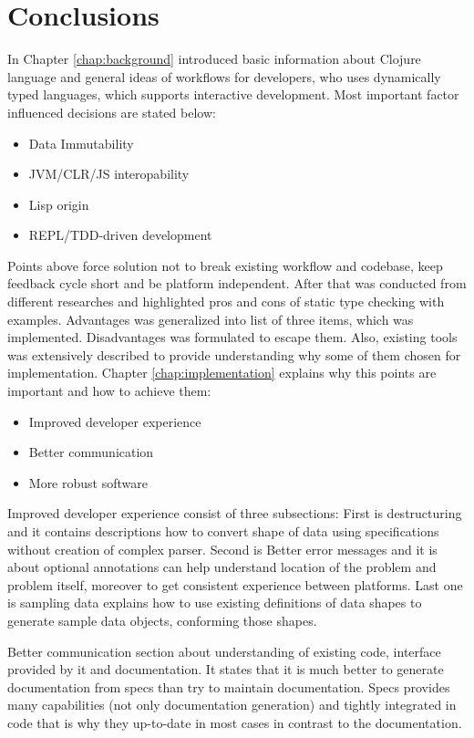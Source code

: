 \chapter{Conclusions}
\label{chap:conclusions}

In Chapter \ref{chap:background} introduced basic information about Clojure
language and general ideas of workflows for developers, who uses dynamically typed
languages, which supports interactive development. Most important factor
influenced decisions are stated below:

\begin{itemize}
\item Data Immutability
\item JVM/CLR/JS interopability
\item Lisp origin
\item REPL/TDD-driven development
\end{itemize}

Points above force solution not to break existing workflow and codebase, keep
feedback cycle short and be platform independent. After that was conducted from
different researches and highlighted pros and cons of static type checking with
examples. Advantages was generalized into list of three items, which was
implemented. Disadvantages was formulated to escape them. Also, existing tools
was extensively described to provide understanding why some of them chosen for
implementation. Chapter \ref{chap:implementation} explains why this points are
important and how to achieve them:

\begin{itemize}
\item Improved developer experience
\item Better communication
\item More robust software
\end{itemize}

Improved developer experience consist of three subsections: First is
destructuring and it contains descriptions how to convert shape of data using
specifications without creation of complex parser. Second is Better error
messages and it is about optional annotations can help understand location of
the problem and problem itself, moreover to get consistent experience between
platforms. Last one is sampling data explains how to use existing definitions of
data shapes to generate sample data objects, conforming those shapes.

Better communication section about understanding of existing code, interface
provided by it and documentation. It states that it is much better to generate
documentation from specs than try to maintain documentation. Specs provides many
capabilities (not only documentation generation) and tightly integrated in code
that is why they up-to-date in most cases in contrast to the documentation.

